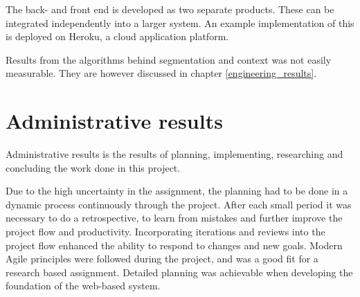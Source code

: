 The back- and front end is developed as two separate products. These can be integrated independently into a larger system. An example implementation of this is deployed on Heroku, a cloud application platform.

Results from the algorithms behind segmentation and context was not easily measurable. They are however discussed in chapter \ref{engineering_results}.

\section{Administrative results}
Administrative results is the results of planning, implementing, researching and concluding the work done in this project. 

Due to the high uncertainty in the assignment, the planning had to be done in a dynamic process continuously through the project. After each small period it was necessary to do a retrospective, to learn from mistakes and further improve the project flow and productivity. Incorporating iterations and reviews into the project flow enhanced the ability to respond to changes and new goals. Modern Agile principles were followed during the project, and was a good fit for a research based assignment. Detailed planning was achievable when developing the foundation of the web-based system. 
